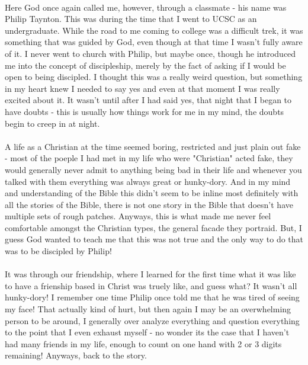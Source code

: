 \documentclass[a4paper]{article}
\begin{document}
\paragraph{}
Here God once again called me, however, through a classmate - his name was Philip Taynton. This was during
the time that I went to UCSC as an undergraduate. While the road to me coming to college was a difficult trek,
it was something that was guided by God, even though at that time I wasn't fully aware of it. I never went
to church with Philip, but maybe once, though he introduced me into the concept of discipleship, merely by
the fact of asking if I would be open to being discipled. I thought this was a really weird question, but
something in my heart knew I needed to say yes and even at that moment I was really excited about it. It
wasn't until after I had said yes, that night that I began to have doubts - this is usually how things work
for me in my mind, the doubts begin to creep in at night. 

\paragraph{}
A life as a Christian at the time seemed boring,
restricted and just plain out fake - most of the poeple I had met in my life who were "Christian" acted
fake, they would generally never admit to anything being bad in their life and whenever you talked with them
everything was always great or hunky-dory. And in my mind and understanding of the Bible this didn't seem to be
inline most definitely with all the stories of the Bible, there is not one story in the Bible that doesn't
have multiple sets of rough patches. Anyways, this is what made me never feel comfortable amongst the Christian
types, the general facade they portraid. But, I guess God wanted to teach me that this was not true and the
only way to do that was to be discipled by Philip! 

\paragraph{}
It was through our friendship, where I learned for the
first time what it was like to have a frienship based in Christ was truely like, and guess what? It wasn't
all hunky-dory! I remember one time Philip once told me that he was tired of seeing my face! That actually
kind of hurt, but then again I may be an overwhelming person to be around, I generally over analyze
everything and question everything to the point that I even exhaust myself - no wonder its the case that I
haven't had many friends in my life, enough to count on one hand with 2 or 3 digits remaining! Anyways, back
to the story. 
\end{document}
